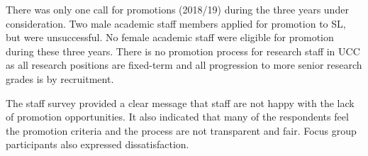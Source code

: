 There was only one call for promotions (2018/19) during the three years under consideration. Two male academic staff members applied for promotion to \ac{SL}, but were unsuccessful. %
No female academic staff were eligible for promotion during these three years. 
There is no promotion process for research staff in UCC as all research positions are fixed-term and all progression to more senior research grades is by recruitment. 


The staff survey provided a clear message that staff are not happy with the lack of promotion opportunities. It also indicated that many of the respondents feel the promotion criteria and the process are not transparent and fair. Focus group participants also expressed dissatisfaction. %






